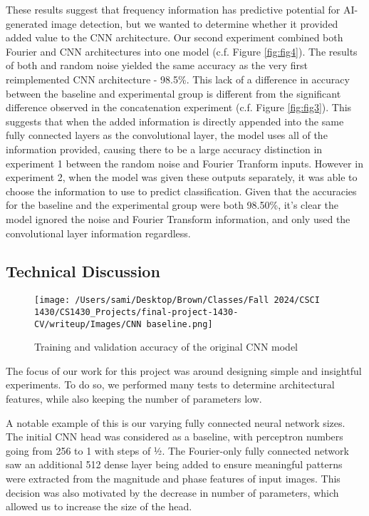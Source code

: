 These results suggest that frequency information has predictive potential for AI-generated image detection, but we wanted to determine whether it provided added value to the CNN architecture. Our second experiment combined both Fourier and CNN architectures into one model (c.f. Figure \ref{fig:fig4}). The results of both and random noise yielded the same accuracy as the very first reimplemented CNN architecture - 98.5\%. This lack of a difference in accuracy between the baseline and experimental group is different from the significant difference observed in the concatenation experiment (c.f. Figure \ref{fig:fig3}). This suggests that when the added information is directly appended into the same fully connected layers as the convolutional layer, the model uses all of the information provided, causing there to be a large accuracy distinction in experiment 1 between the random noise and Fourier Tranform inputs. However in experiment 2, when the model was given these outputs separately, it was able to choose the information to use to predict classification. Given that the accuracies for the baseline and the experimental group were both 98.50\%, it’s clear the model ignored the noise and Fourier Transform information, and only used the convolutional layer information regardless.


\subsection{Technical Discussion}
\begin{figure}[htbp]
    \centering
    \texttt{[image: /Users/sami/Desktop/Brown/Classes/Fall 2024/CSCI 1430/CS1430\_Projects/final-project-1430-CV/writeup/Images/CNN baseline.png]}
    \caption{Training and validation accuracy of the original CNN model}
    \label{fig:fig5}
\end{figure}
The focus of our work for this project was around designing simple and insightful experiments. To do so, we performed many tests to determine architectural features, while also keeping the number of parameters low.

A notable example of this is our varying fully connected neural network sizes. The initial CNN head was considered as a baseline, with perceptron numbers going from 256 to 1 with steps of ½. The Fourier-only fully connected network saw an additional 512 dense layer being added to ensure meaningful patterns were extracted from the magnitude and phase features of input images. This decision was also motivated by the decrease in number of parameters, which allowed us to increase the size of the head.

